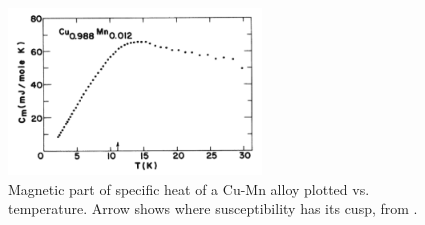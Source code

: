 \begin{figure}
  \centering
  \includegraphics[width=0.6\textwidth]{img/cv.png}
\caption{\label{fig:cu-mn-cv}Magnetic part of specific heat of a Cu-Mn alloy plotted vs. temperature. Arrow shows where susceptibility has its cusp, from \citet{PhysRevB.13.4053}.}
\end{figure}

  

